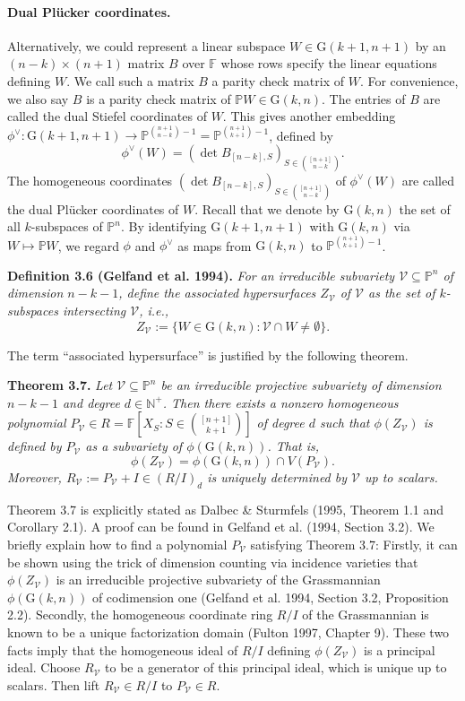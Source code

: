 \documentclass[10pt,a4paper]{article}
\newcommand{\FF}{\mathbb F}
\newcommand{\PP}{\mathbb P}
\newcommand{\GG}{\mathrm G}
\newenvironment{result}[1]{\par\medskip\noindent\textbf{#1.}\itshape}{\par\medskip}
\begin{document}
\paragraph{Dual Pl\"ucker coordinates.}
Alternatively, we could represent a linear subspace $W\in\GG(k+1,n+1)$ by an $(n-k)\times(n+1)$ matrix $B$ over $\FF$ whose rows specify the linear equations defining $W$. We call such a matrix $B$ a parity check matrix of $W$. For convenience, we also say $B$ is a parity check matrix of $\PP W\in\GG(k,n)$.
The entries of $B$ are called the dual Stiefel coordinates of $W$. This gives another embedding $\phi^\vee:\GG(k+1,n+1)\to\PP^{\binom{n+1}{n-k}-1}=\PP^{\binom{n+1}{k+1}-1}$, defined by
\[\phi^\vee(W)=(\det B_{[n-k],S})_{S\in\binom{[n+1]}{n-k}}.\]
The homogeneous coordinates $(\det B_{[n-k],S})_{S\in\binom{[n+1]}{n-k}}$ of $\phi^\vee(W)$ are called the dual Pl\"ucker coordinates of $W$.
Recall that we denote by $\GG(k,n)$ the set of all $k$-subspaces of $\PP^n$. By identifying $\GG(k+1,n+1)$ with $\GG(k,n)$ via $W\mapsto\PP W$, we regard $\phi$ and $\phi^\vee$ as maps from $\GG(k,n)$ to $\PP^{\binom{n+1}{k+1}-1}$.
\begin{result}{Definition 3.6 (Gelfand et al. 1994)}
For an irreducible subvariety $\mathcal V\subseteq\PP^n$ of dimension $n-k-1$, define the associated hypersurfaces $Z_{\mathcal V}$ of $\mathcal V$ as the set of $k$-subspaces intersecting $\mathcal V$, i.e.,
\[Z_{\mathcal V}:=\{W\in\GG(k,n):\mathcal V\cap W\ne\emptyset\}.\]
\end{result}
The term ``associated hypersurface'' is justified by the following theorem.
\begin{result}{Theorem 3.7}
Let $\mathcal V\subseteq\PP^n$ be an irreducible projective subvariety of dimension $n-k-1$ and degree $d\in\mathbb N^+$. Then there exists a nonzero homogeneous polynomial $P_{\mathcal V}\in R=\FF[X_S:S\in\binom{[n+1]}{k+1}]$ of degree $d$ such that $\phi(Z_{\mathcal V})$ is defined by $P_{\mathcal V}$ as a subvariety of $\phi(\GG(k,n))$. That is,
\[\phi(Z_{\mathcal V})=\phi(\GG(k,n))\cap V(P_{\mathcal V}).\]
Moreover, $R_{\mathcal V}:=P_{\mathcal V}+I\in(R/I)_d$ is uniquely determined by $\mathcal V$ up to scalars.
\end{result}
Theorem 3.7 is explicitly stated as Dalbec \& Sturmfels (1995, Theorem 1.1 and Corollary 2.1). A proof can be found in Gelfand et al. (1994, Section 3.2). We briefly explain how to find a polynomial $P_{\mathcal V}$ satisfying Theorem 3.7: Firstly, it can be shown using the trick of dimension counting via incidence varieties that $\phi(Z_{\mathcal V})$ is an irreducible projective subvariety of the Grassmannian $\phi(\GG(k,n))$ of codimension one (Gelfand et al. 1994, Section 3.2, Proposition 2.2). Secondly, the homogeneous coordinate ring $R/I$ of the Grassmannian is known to be a unique factorization domain (Fulton 1997, Chapter 9). These two facts imply that the homogeneous ideal of $R/I$ defining $\phi(Z_{\mathcal V})$ is a principal ideal. Choose $R_{\mathcal V}$ to be a generator of this principal ideal, which is unique up to scalars. Then lift $R_{\mathcal V}\in R/I$ to $P_{\mathcal V}\in R$.
\end{document}

